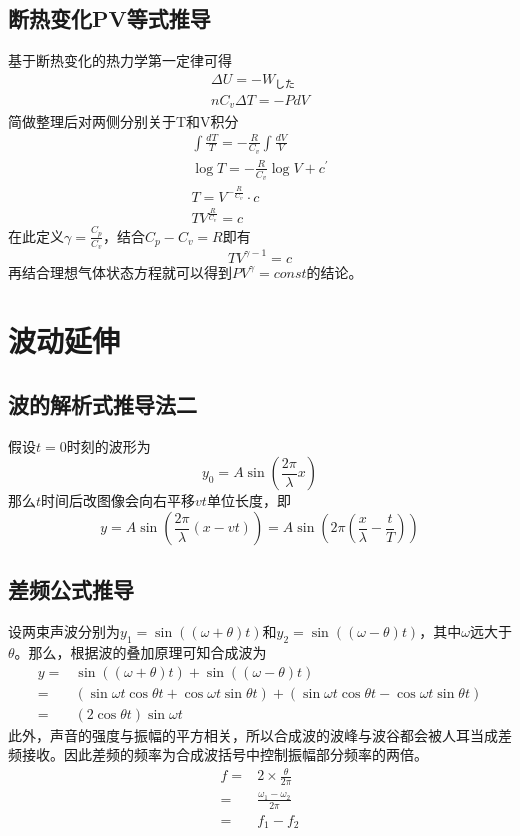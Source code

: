 \subsection{断热变化PV等式推导}

基于断热变化的热力学第一定律可得
\begin{gather*}
    \Delta U=-W_\textrm{した}\\
    nC_v\Delta T=-PdV
\end{gather*}
简做整理后对两侧分别关于T和V积分
\begin{gather*}
    \int\frac{dT}{T}=-\frac{R}{C_v}\int\frac{dV}{V}\\
    \log T=-\frac{R}{C_v}\log V+c^\prime\\
    T=V^{-\frac{R}{C_v}}\cdot c\\
    TV^{\frac{R}{C_v}}=c
\end{gather*}
在此定义$\gamma=\frac{C_p}{C_v}$，结合$C_p-C_v=R$即有
\begin{equation*}
    TV^{\gamma-1}=c
\end{equation*}
再结合理想气体状态方程就可以得到$PV^\gamma=const$的结论。

\section{波动延伸}

\subsection{波的解析式推导法二}

假设$t=0$时刻的波形为
\begin{equation*}
    y_0=A\sin\left(\frac{2\pi}{\lambda}x\right)
\end{equation*}
那么$t$时间后改图像会向右平移$vt$单位长度，即
\begin{equation*}
    y=A\sin\left(\frac{2\pi}{\lambda}\left(x-vt\right)\right)
    =A\sin\left(2\pi\left(\frac{x}{\lambda}-\frac{t}{T}\right)\right)
\end{equation*}

\subsection{差频公式推导}

设两束声波分别为$y_1=\sin((\omega+\theta)t)$和$y_2=\sin((\omega-\theta)t)$，其中$\omega$远大于$\theta$。那么，根据波的叠加原理可知合成波为
\begin{align*}
    y=&\sin((\omega+\theta)t)+\sin((\omega-\theta)t)\\
    =&(\sin\omega t\cos\theta t+\cos\omega t\sin\theta t)+(\sin\omega t\cos\theta t-\cos\omega t\sin\theta t)\\
    =&(2\cos\theta t)\sin\omega t
\end{align*}
此外，声音的强度与振幅的平方相关，所以合成波的波峰与波谷都会被人耳当成差频接收。因此差频的频率为合成波括号中控制振幅部分频率的两倍。
\begin{align*}
    f=&2\times\frac{\theta}{2\pi}\\
    =&\frac{\omega_1-\omega_2}{2\pi}\\
    =&f_1-f_2
\end{align*}

